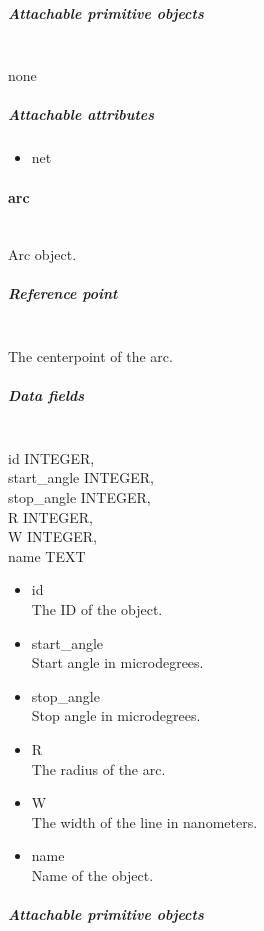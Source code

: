 \documentclass[12pt]{article}
\begin{document}
\subparagraph{Attachable primitive
objects}\label{attachable-primitive-objects}

\mbox{}\\

none

\subparagraph{Attachable attributes}\label{attachable-attributes}

\begin{itemize}
\item
  net
\end{itemize}

\paragraph{arc}\label{arc}

\mbox{}\\

Arc object.

\subparagraph{Reference point}\label{reference-point-1}

\mbox{}\\

The centerpoint of the arc.

\subparagraph{Data fields}\label{data-fields-1}

\mbox{}\\

id INTEGER,\\
start\_angle INTEGER,\\
stop\_angle INTEGER,\\
R INTEGER,\\
W INTEGER,\\
name TEXT

\begin{itemize}
\item
  id\\The ID of the object.
\item start\_angle\\
Start angle in microdegrees.
\item stop\_angle\\
Stop angle in microdegrees.
\item R\\
The radius of the arc.
\item W\\
The width of the line in nanometers.
\item
  name\\Name of the object.
\end{itemize}

\subparagraph{Attachable primitive
objects}\label{attachable-primitive-objects-1}
\end{document}
